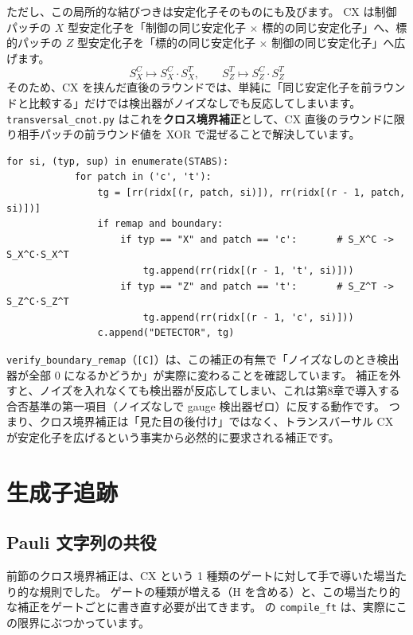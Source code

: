 ただし、この局所的な結びつきは安定化子そのものにも及びます。
CX は制御パッチの $X$ 型安定化子を「制御の同じ安定化子 $\times$ 標的の同じ安定化子」へ、標的パッチの $Z$ 型安定化子を「標的の同じ安定化子 $\times$ 制御の同じ安定化子」へ広げます。
\begin{equation}
  S_X^C \longmapsto S_X^C \cdot S_X^T, \qquad S_Z^T \longmapsto S_Z^C \cdot S_Z^T
\end{equation}
そのため、CX を挟んだ直後のラウンドでは、単純に「同じ安定化子を前ラウンドと比較する」だけでは検出器がノイズなしでも反応してしまいます。
\texttt{transversal\_cnot.py} はこれを\textbf{クロス境界補正}として、CX 直後のラウンドに限り相手パッチの前ラウンド値を XOR で混ぜることで解決しています。

\begin{lstlisting}[caption={CX 直後ラウンドのクロス境界補正（src/stages/01\_mpp/src/ftqc/transversal\_cnot.py）}]
        for si, (typ, sup) in enumerate(STABS):
            for patch in ('c', 't'):
                tg = [rr(ridx[(r, patch, si)]), rr(ridx[(r - 1, patch, si)])]
                if remap and boundary:
                    if typ == "X" and patch == 'c':       # S_X^C -> S_X^C·S_X^T
                        tg.append(rr(ridx[(r - 1, 't', si)]))
                    if typ == "Z" and patch == 't':       # S_Z^T -> S_Z^C·S_Z^T
                        tg.append(rr(ridx[(r - 1, 'c', si)]))
                c.append("DETECTOR", tg)
\end{lstlisting}

\texttt{verify\_boundary\_remap}（\texttt{[C]}）は、この補正の有無で「ノイズなしのとき検出器が全部 0 になるかどうか」が実際に変わることを確認しています。
補正を外すと、ノイズを入れなくても検出器が反応してしまい、これは第8章で導入する合否基準の第一項目（ノイズなしで gauge 検出器ゼロ）に反する動作です。
つまり、クロス境界補正は「見た目の後付け」ではなく、トランスバーサル CX が安定化子を広げるという事実から必然的に要求される補正です。

\section{生成子追跡}\label{sec:gen_tracking}

\subsection{Pauli 文字列の共役}\label{subsec:conjugation}

前節のクロス境界補正は、CX という 1 種類のゲートに対して手で導いた場当たり的な規則でした。
ゲートの種類が増える（H を含める）と、この場当たり的な補正をゲートごとに書き直す必要が出てきます。
 の \texttt{compile\_ft} は、実際にこの限界にぶつかっています。

